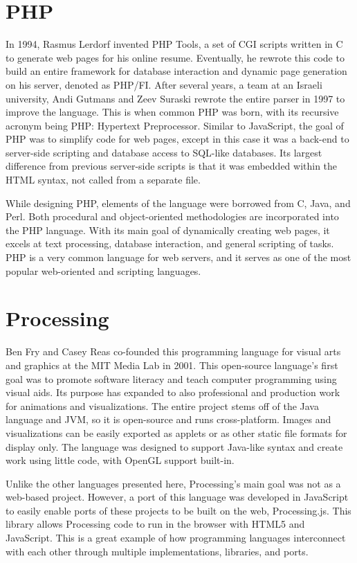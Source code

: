 \documentclass[11pt]{article}
\begin{document}
\section{PHP}
In 1994, Rasmus Lerdorf invented PHP Tools, a set of CGI scripts written in C to generate web pages for his online resume.\cite{sean-php} Eventually, he rewrote this code to build an entire framework for database interaction and dynamic page generation on his server, denoted as PHP/FI.\cite{sean-php} After several years, a team at an Israeli university, Andi Gutmans and Zeev Suraski rewrote the entire parser in 1997 to improve the language. This is when common PHP was born, with its recursive acronym being PHP: Hypertext Preprocessor.\cite{sean-php} Similar to JavaScript, the goal of PHP was to simplify code for web pages, except in this case it was a back-end to server-side scripting and database access to SQL-like databases. Its largest difference from previous server-side scripts is that it was embedded within the HTML syntax, not called from a separate file.

While designing PHP, elements of the language were borrowed from C, Java, and Perl. Both procedural and object-oriented methodologies are incorporated into the PHP language. With its main goal of dynamically creating web pages, it excels at text processing, database interaction, and general scripting of tasks. PHP is a very common language for web servers, and it serves as one of the most popular web-oriented and scripting languages.\cite{sean-php}


\section{Processing}
Ben Fry and Casey Reas co-founded this programming language for visual arts and graphics at the MIT Media Lab in 2001.\cite{sean-processing-1} This open-source language’s first goal was to promote software literacy and teach computer programming using visual aids. Its purpose has expanded to also professional and production work for animations and visualizations. The entire project stems off of the Java language and JVM, so it is open-source and runs cross-platform. Images and visualizations can be easily exported as applets or as other static file formats for display only. The language was designed to support Java-like syntax and create work using little code, with OpenGL support built-in.\cite{sean-processing-1}

Unlike the other languages presented here, Processing’s main goal was not as a web-based project. However, a port of this language was developed in JavaScript to easily enable ports of these projects to be built on the web, Processing.js.\cite{sean-processing-2} This library allows Processing code to run in the browser with HTML5 and JavaScript. This is a great example of how programming languages interconnect with each other through multiple implementations, libraries, and ports.
\end{document}
